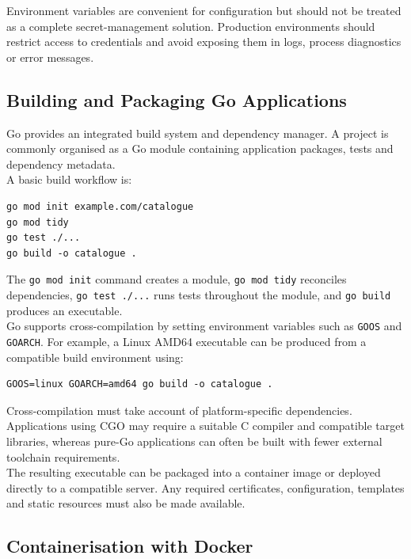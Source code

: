 Environment variables are convenient for configuration but should not be treated as a complete secret-management solution. Production environments should restrict access to credentials and avoid exposing them in logs, process diagnostics or error messages.

\subsection{Building and Packaging Go Applications}

Go provides an integrated build system and dependency manager. A project is commonly organised as a Go module containing application packages, tests and dependency metadata.\\

A basic build workflow is:

\begin{lstlisting}
go mod init example.com/catalogue
go mod tidy
go test ./...
go build -o catalogue .
\end{lstlisting}

The \texttt{go mod init} command creates a module, \texttt{go mod tidy} reconciles dependencies, \texttt{go test ./...} runs tests throughout the module, and \texttt{go build} produces an executable.\\

Go supports cross-compilation by setting environment variables such as \texttt{GOOS} and \texttt{GOARCH}. For example, a Linux AMD64 executable can be produced from a compatible build environment using:

\begin{lstlisting}
GOOS=linux GOARCH=amd64 go build -o catalogue .
\end{lstlisting}

Cross-compilation must take account of platform-specific dependencies. Applications using CGO may require a suitable C compiler and compatible target libraries, whereas pure-Go applications can often be built with fewer external toolchain requirements.\\

The resulting executable can be packaged into a container image or deployed directly to a compatible server. Any required certificates, configuration, templates and static resources must also be made available.

\subsection{Containerisation with Docker}

